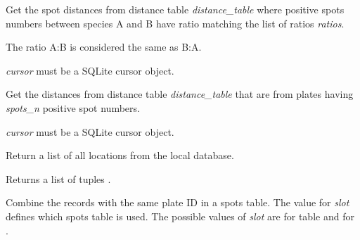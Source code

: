 \documentclass[letterpaper,10pt,english]{sphinxmanual}
\begin{document}
\begin{fulllineitems}
\begin{fulllineitems}
\label{setlyze/database:setlyze.database.AccessDBGeneric.get_distances_matching_ratios}
Get the spot distances from distance table \emph{distance\_table} where
positive spots numbers between species A and B have ratio
matching the list of ratios \emph{ratios}.

The ratio A:B is considered the same as B:A.

\emph{cursor} must be a SQLite cursor object.

\end{fulllineitems}


\begin{fulllineitems}
\label{setlyze/database:setlyze.database.AccessDBGeneric.get_distances_matching_spots_total}
Get the distances from distance table \emph{distance\_table} that
are from plates having \emph{spots\_n} positive spot numbers.

\emph{cursor} must be a SQLite cursor object.

\end{fulllineitems}


\begin{fulllineitems}
\label{setlyze/database:setlyze.database.AccessDBGeneric.get_locations}
Return a list of all locations from the local database.

Returns a list of tuples .

\end{fulllineitems}


\begin{fulllineitems}
\label{setlyze/database:setlyze.database.AccessDBGeneric.make_plates_unique}
Combine the records with the same plate ID in a spots table.
The value for \emph{slot} defines which spots table is used.
The possible values of \emph{slot} are  for table
 and  for .


\end{fulllineitems}
\end{fulllineitems}
\end{document}
